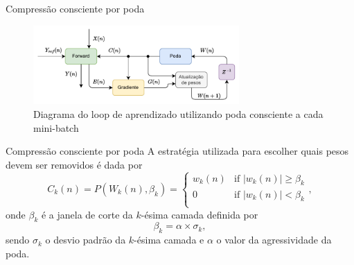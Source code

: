 \begin{frame}{Compressão consciente por poda}
    \begin{figure}[H]
    \centering
    \includegraphics[width=0.7\textwidth]{figuras/prune_scheme.pdf}
    \caption{Diagrama do loop de aprendizado utilizando poda consciente a cada mini-batch}
    \end{figure}
    
\end{frame}

\begin{frame}{Compressão consciente por poda}
A estratégia utilizada para escolher quais pesos devem ser removidos é dada por 
\begin{equation}
    C_k(n) = P(W_k(n),\beta_k) =
    \begin{cases}
      w_k(n) & \text{if } |w_k(n)|\geq \beta_k \\
      0 & \text{if } |w_k(n)| < \beta_k\\
    \end{cases} ,
\end{equation}
onde $\beta_k$ é a janela de corte da $k$-ésima camada definida por
\begin{equation}
    \beta_k = \alpha \times \sigma_k,
\end{equation}
sendo $\sigma_k$ o desvio padrão da $k$-ésima camada e $\alpha$ o valor da agressividade da poda.

\end{frame}





